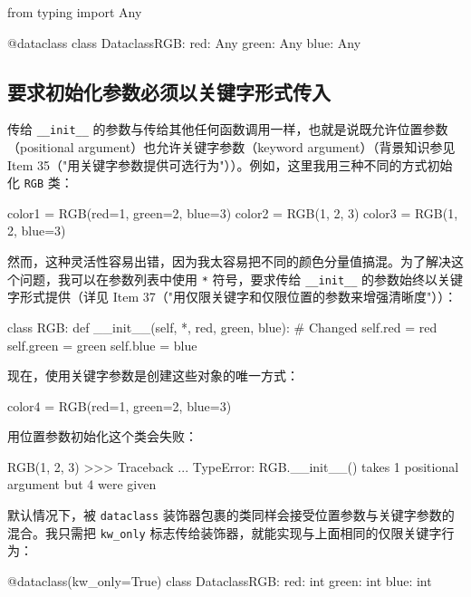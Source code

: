 \begin{codebox}[python]
from typing import Any

@dataclass
class DataclassRGB:
    red: Any
    green: Any
    blue: Any
\end{codebox}

\subsection{要求初始化参数必须以关键字形式传入}

传给 \texttt{\_\_init\_\_} 的参数与传给其他任何函数调用一样，也就是说既允许位置参数（positional argument）也允许关键字参数（keyword argument）（背景知识参见 Item 35（"用关键字参数提供可选行为"））。例如，这里我用三种不同的方式初始化 \texttt{RGB} 类：

\begin{codebox}[python]
color1 = RGB(red=1, green=2, blue=3)
color2 = RGB(1, 2, 3)
color3 = RGB(1, 2, blue=3)
\end{codebox}

然而，这种灵活性容易出错，因为我太容易把不同的颜色分量值搞混。为了解决这个问题，我可以在参数列表中使用 \texttt{*} 符号，要求传给 \texttt{\_\_init\_\_} 的参数始终以关键字形式提供（详见 Item 37（"用仅限关键字和仅限位置的参数来增强清晰度"））：

\begin{codebox}[python]
class RGB:
    def __init__(self, *, red, green, blue):  # Changed
        self.red = red
        self.green = green
        self.blue = blue
\end{codebox}

现在，使用关键字参数是创建这些对象的唯一方式：

\begin{codebox}[python]
color4 = RGB(red=1, green=2, blue=3)
\end{codebox}

用位置参数初始化这个类会失败：

\begin{codebox}[python]
RGB(1, 2, 3)
>>>
Traceback ...
TypeError: RGB.__init__() takes 1 positional argument but 4
were given
\end{codebox}

默认情况下，被 \texttt{dataclass} 装饰器包裹的类同样会接受位置参数与关键字参数的混合。我只需把 \texttt{kw\_only} 标志传给装饰器，就能实现与上面相同的仅限关键字行为：

\begin{codebox}[python]
@dataclass(kw_only=True)
class DataclassRGB:
    red: int
    green: int
    blue: int
\end{codebox}

